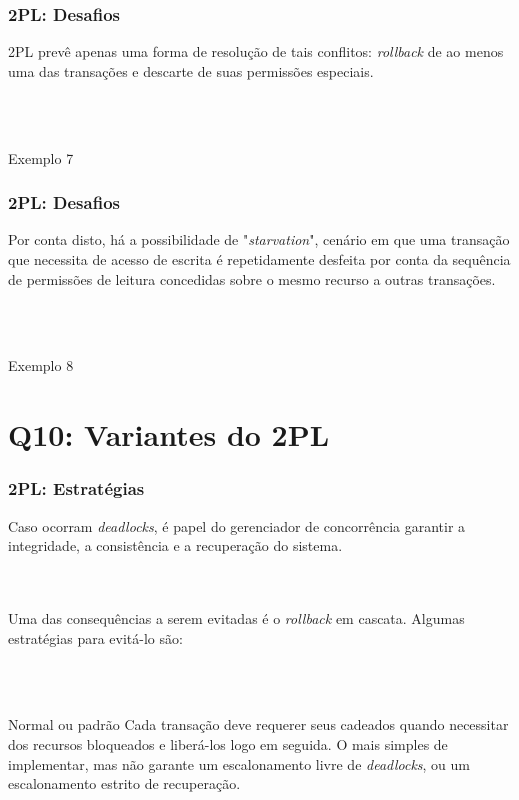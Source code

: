 \documentclass{beamer}
\begin{document}
\begin{frame}
    \frametitle{2PL: Desafios}
    2PL prevê apenas uma forma de resolução de tais conflitos: \emph{rollback} de ao menos uma das transações e descarte de suas permissões especiais.

    \\~\\
    \begin{example}{Exemplo 7}
    \end{example}
\end{frame}

\begin{frame}
    \frametitle{2PL: Desafios}
    Por conta disto, há a possibilidade de "\emph{starvation}", cenário em que uma transação que necessita de acesso de escrita é repetidamente desfeita por conta da sequência de permissões de leitura concedidas sobre o mesmo recurso a outras transações.

    \\~\\
    \begin{example}{Exemplo 8}
    \end{example}
\end{frame}

\section{Q10: Variantes do 2PL}


\begin{frame}
    \frametitle{2PL: Estratégias}
    
    Caso ocorram \emph{deadlocks}, é papel do gerenciador de concorrência garantir a integridade, a consistência e a recuperação do sistema.
    
    \\~\\
    Uma das consequências a serem evitadas é o \emph{rollback} em cascata. Algumas estratégias para evitá-lo são:
    
    \\~\\
    \begin{block}{Normal ou padrão}
        Cada transação deve requerer seus cadeados quando necessitar dos recursos bloqueados e liberá-los logo em seguida. O mais simples de implementar, mas não garante um escalonamento livre de \emph{deadlocks}, ou um escalonamento estrito de recuperação.
    \end{block}
\end{frame}
\end{document}

